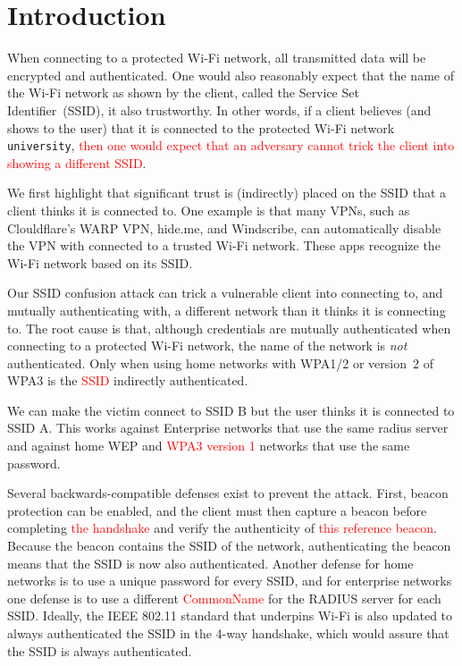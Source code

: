 \documentclass[sigconf,review]{acmart}
\newcommand{\wifi}{\mbox{Wi-Fi}}
\newcommand{\fourway}{\mbox{4-way}}
\DeclareRobustCommand{\red}[1]{\textcolor{red}{#1}}
\begin{document}
\maketitle

\section{Introduction}

When connecting to a protected \wifi{} network, all transmitted data will be encrypted and authenticated.
One would also reasonably expect that the name of the \wifi{} network as shown by the client, called the Service Set Identifier~(SSID), it also trustworthy.
In other words, if a client believes (and shows to the user) that it is connected to the protected \wifi{} network \verb|university|, \red{then one would expect that an adversary cannot trick the client into showing a different SSID}.

We first highlight that significant trust is (indirectly) placed on the SSID that a client thinks it is connected to.
One example is that many VPNs, such as Clouldflare's WARP VPN, hide.me, and Windscribe, can automatically disable the VPN with connected to a trusted \wifi{} network.
These apps recognize the \wifi{} network based on its SSID.

Our SSID confusion attack can trick a vulnerable client into connecting to, and mutually authenticating with, a different network than it thinks it is connecting to.
The root cause is that, although credentials are mutually authenticated when connecting to a protected \wifi{} network, the name of the network is \emph{not} authenticated.
Only when using home networks with WPA1/2 or version~2 of WPA3 is the \red{SSID} indirectly authenticated.

We can make the victim connect to SSID B but the user thinks it is connected to SSID A.
This works against Enterprise networks that use the same radius server and against home WEP and \red{WPA3 version 1} networks that use the same password.

Several backwards-compatible defenses exist to prevent the attack.
First, beacon protection can be enabled, and the client must then capture a beacon before completing \red{the handshake} and verify the authenticity of \red{this reference beacon}.
Because the beacon contains the SSID of the network, authenticating the beacon means that the SSID is now also authenticated.
Another defense for home networks is to use a unique password for every SSID, and for enterprise networks one defense is to use a different \red{CommonName} for the RADIUS server for each SSID.
Ideally, the IEEE 802.11 standard that underpins \wifi{} is also updated to always authenticated the SSID in the \fourway{} handshake, which would assure that the SSID is always authenticated.
\end{document}
